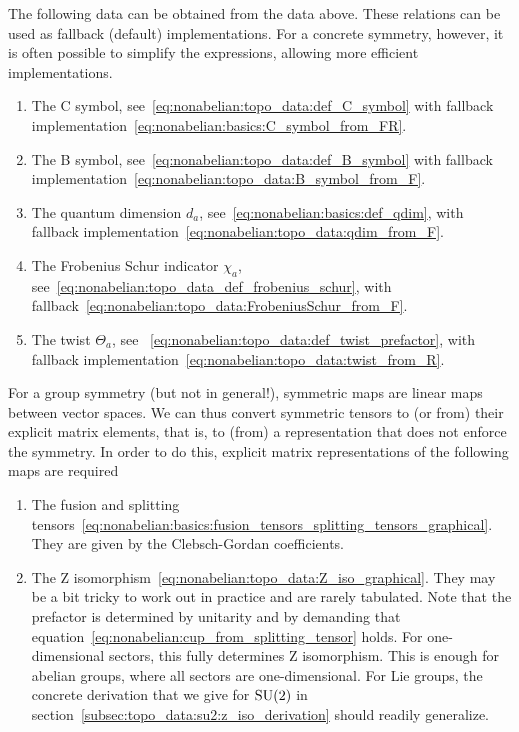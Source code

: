 The following data can be obtained from the data above.
%
These relations can be used as fallback (default) implementations.
%
For a concrete symmetry, however, it is often possible to simplify the expressions, allowing more efficient implementations.
\begin{enumerate}[resume,label=(\roman*)]
    \item \label{item:nonabelian:topo_data:summary:optional_first} 
    The C symbol, see~\eqref{eq:nonabelian:topo_data:def_C_symbol} with fallback implementation~\eqref{eq:nonabelian:basics:C_symbol_from_FR}.
    \item 
    The B symbol, see~\eqref{eq:nonabelian:topo_data:def_B_symbol} with fallback implementation~\eqref{eq:nonabelian:topo_data:B_symbol_from_F}.
    \item
    The quantum dimension $d_a$, see~\eqref{eq:nonabelian:basics:def_qdim}, with fallback implementation~\eqref{eq:nonabelian:topo_data:qdim_from_F}.
    \item 
    The Frobenius Schur indicator $\chi_a$, see~\eqref{eq:nonabelian:topo_data_def_frobenius_schur}, with fallback~\eqref{eq:nonabelian:topo_data:FrobeniusSchur_from_F}.
    \item \label{item:nonabelian:topo_data:summary:optional_last}%
    The twist $\Theta_a$, see ~\eqref{eq:nonabelian:topo_data:def_twist_prefactor}, with fallback implementation~\eqref{eq:nonabelian:topo_data:twist_from_R}.
\end{enumerate}

For a group symmetry (but not in general!), symmetric maps are linear maps between vector spaces.
%
We can thus convert symmetric tensors to (or from) their explicit matrix elements, that is, to (from) a representation that does not enforce the symmetry.
%
In order to do this, explicit matrix representations of the following maps are required
\begin{enumerate}[resume,label=(\roman*)]
    \item The fusion and splitting tensors~\eqref{eq:nonabelian:basics:fusion_tensors_splitting_tensors_graphical}. They are given by the Clebsch-Gordan coefficients.
    \item The Z isomorphism~\eqref{eq:nonabelian:topo_data:Z_iso_graphical}. They may be a bit tricky to work out in practice and are rarely tabulated. Note that the prefactor is determined by unitarity and by demanding that equation~\eqref{eq:nonabelian:cup_from_splitting_tensor} holds.
    For one-dimensional sectors, this fully determines Z isomorphism. This is enough for abelian groups, where all sectors are one-dimensional. For Lie groups, the concrete derivation that we give for $\mathrm{SU}(2)$ in section~\ref{subsec:topo_data:su2:z_iso_derivation} should readily generalize.
\end{enumerate}

